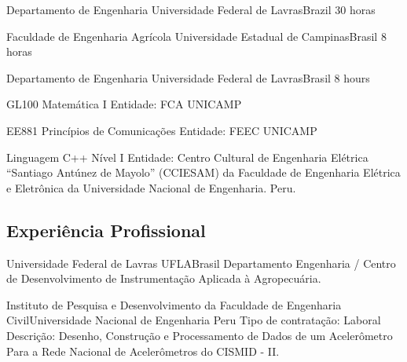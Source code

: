 \documentclass[11pt,a4paper,sans]{moderncv} %
\begin{document}

	      {Departamento de Engenharia}
	      {Universidade Federal de Lavras}{Brazil}
	      {30 horas}

\begin{comment}
\cventry{2do Semestre 2018}{PSI528 - Processamento de sinais}
	      {Departamento de Engenharia}
	      {Universidade Federal de Lavras}{Brasil}
	      {30 horas }
\cventry{1ro Semestre 2018}{PSI528 - Processamento de sinais}
	      {Departamento de Engenharia}
	      {Universidade Federal de Lavras}{Brasil}
	      {30 horas }
\end{comment}
	      
	      {Faculdade de Engenharia Agrícola}
	      {Universidade Estadual de Campinas}{Brasil}
	      {8 horas }
	      
	      {Departamento de Engenharia}
	      {Universidade Federal de Lavras}{Brasil}
	      {8 hours}
	      
			  {GL100 }{Matemática I}{}
			  {Entidade: FCA UNICAMP }

			  {EE881 }{Princípios de Comunicações}{}
			  {Entidade: FEEC UNICAMP }

	      {Linguagem C++ }{ Nível I}{}
	      {Entidade: Centro Cultural de Engenharia Elétrica ``Santiago 
	      Antúnez de Mayolo'' (CCIESAM) da Faculdade de Engenharia Elétrica 
	      e Eletrônica da Universidade Nacional de Engenharia. Peru.}

\subsection{Experiência Profissional}


	      {Universidade Federal de Lavras}
	      {UFLA}{Brasil}
	      {Departamento Engenharia / Centro de Desenvolvimento de Instrumentação Aplicada à Agropecuária. }


		      {Instituto de Pesquisa e Desenvolvimento da Faculdade 
		      de Engenharia Civil}{Universidade Nacional de Engenharia }{Peru}
		      {Tipo de contratação: Laboral\newline{}
		      Descrição: Desenho, Construção e Processamento de Dados de um 
		      Acelerômetro Para a Rede Nacional de Acelerômetros do CISMID - II.}
\end{document}

